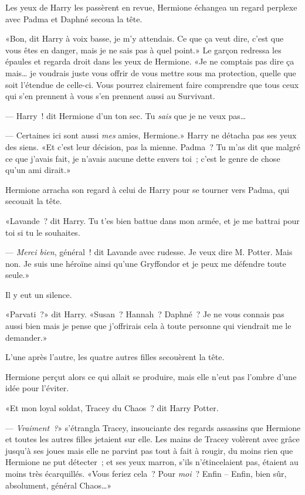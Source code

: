Les yeux de Harry les passèrent en revue, Hermione échangea un regard perplexe avec Padma et Daphné secoua la tête.

«Bon, dit Harry à voix basse, je m'y attendais. Ce que ça veut dire, c'est que vous êtes en danger, mais je ne sais pas à quel point.» Le garçon redressa les épaules et regarda droit dans les yeux de Hermione. «Je ne comptais pas dire ça mais… je voudrais juste vous offrir de vous mettre sous ma protection, quelle que soit l'étendue de celle-ci. Vous pourrez clairement faire comprendre que tous ceux qui s'en prennent à vous s'en prennent aussi au Survivant.

--- Harry~! dit Hermione d'un ton sec. Tu \emph{sais} que je ne veux pas…

--- Certaines ici sont aussi \emph{mes} amies, Hermione.» Harry ne détacha pas ses yeux des siens. «Et c'est leur décision, pas la mienne. Padma~? Tu m'as dit que malgré ce que j'avais fait, je n'avais aucune dette envers toi~; c'est le genre de chose qu'un ami dirait.»

Hermione arracha son regard à celui de Harry pour se tourner vers Padma, qui secouait la tête.

«Lavande~? dit Harry. Tu t'es bien battue dans mon armée, et je me battrai pour toi si tu le souhaites.

--- \emph{Merci bien}, général~! dit Lavande avec rudesse. Je veux dire M. Potter. Mais non. Je suis une héroïne ainsi qu'une Gryffondor et je peux me défendre toute seule.»

Il y eut un silence.

«Parvati~?» dit Harry. «Susan~? Hannah~? Daphné~? Je ne vous connais pas aussi bien mais je pense que j'offrirais cela à toute personne qui viendrait me le demander.»

L'une après l'autre, les quatre autres filles secouèrent la tête.

Hermione perçut alors ce qui allait se produire, mais elle n'eut pas l'ombre d'une idée pour l'éviter.

«Et mon loyal soldat, Tracey du Chaos~? dit Harry Potter.

--- \emph{Vraiment~?}» s'étrangla Tracey, insouciante des regards assassins que Hermione et toutes les autres filles jetaient sur elle. Les mains de Tracey volèrent avec grâce jusqu'à ses joues mais elle ne parvint pas tout à fait à rougir, du moins rien que Hermione ne put détecter~; et ses yeux marron, s'ils n'étincelaient pas, étaient au moins très écarquillés. «Vous feriez cela~? Pour \emph{moi}~? Enfin -- Enfin, bien sûr, absolument, général Chaos…»

